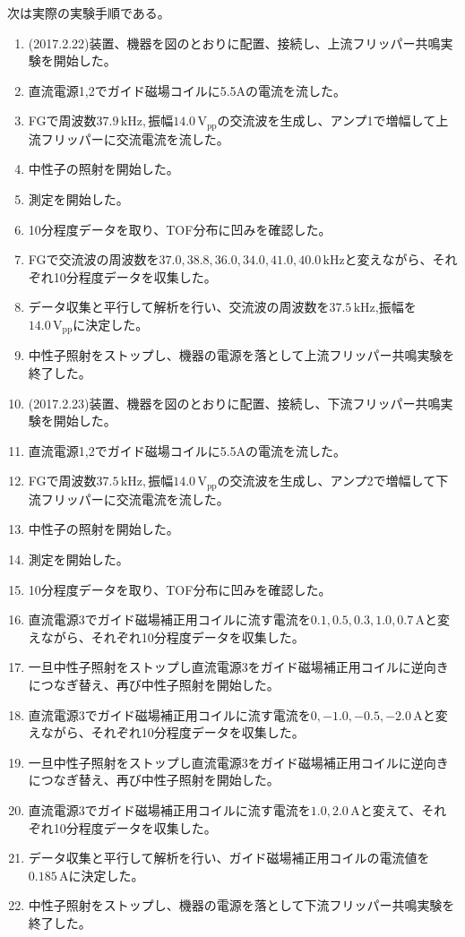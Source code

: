 \newpage
次は実際の実験手順である。
\begin{enumerate}
\item (2017.2.22)装置、機器を図のとおりに配置、接続し、上流フリッパー共鳴実験を開始した。
\item 直流電源1,2でガイド磁場コイルに5.5Aの電流を流した。
\item FGで周波数$37.9\, \mathrm{kHz},振幅14.0\, \mathrm{V_{pp}}$の交流波を生成し、アンプ1で増幅して上流フリッパーに交流電流を流した。
\item 中性子の照射を開始した。
\item 測定を開始した。
\item 10分程度データを取り、TOF分布に凹みを確認した。
\item FGで交流波の周波数を$37.0,38.8,36.0,34.0,41.0,40.0 \, \mathrm{kHz}$と変えながら、それぞれ10分程度データを収集した。
\item データ収集と平行して解析を行い、交流波の周波数を$37.5\, \mathrm{kHz}$,振幅を$14.0\, \mathrm{V_{pp}}$に決定した。
\item 中性子照射をストップし、機器の電源を落として上流フリッパー共鳴実験を終了した。
\item (2017.2.23)装置、機器を図のとおりに配置、接続し、下流フリッパー共鳴実験を開始した。
\item 直流電源1,2でガイド磁場コイルに5.5Aの電流を流した。
\item FGで周波数$37.5\, \mathrm{kHz},振幅14.0\, \mathrm{V_{pp}}$の交流波を生成し、アンプ2で増幅して下流フリッパーに交流電流を流した。
\item 中性子の照射を開始した。
\item 測定を開始した。
\item 10分程度データを取り、TOF分布に凹みを確認した。
\item 直流電源3でガイド磁場補正用コイルに流す電流を$0.1,0.5,0.3,1.0,0.7\,\mathrm{A}$と変えながら、それぞれ10分程度データを収集した。
\item 一旦中性子照射をストップし直流電源3をガイド磁場補正用コイルに逆向きにつなぎ替え、再び中性子照射を開始した。
\item 直流電源3でガイド磁場補正用コイルに流す電流を$0,-1.0,-0.5,-2.0\,\mathrm{A}$と変えながら、それぞれ10分程度データを収集した。
\item 一旦中性子照射をストップし直流電源3をガイド磁場補正用コイルに逆向きにつなぎ替え、再び中性子照射を開始した。
\item 直流電源3でガイド磁場補正用コイルに流す電流を$1.0,2.0\,\mathrm{A}$と変えて、それぞれ10分程度データを収集した。
\item データ収集と平行して解析を行い、ガイド磁場補正用コイルの電流値を$0.185\,\mathrm{A}$に決定した。
\item 中性子照射をストップし、機器の電源を落として下流フリッパー共鳴実験を終了した。
\end{enumerate}

